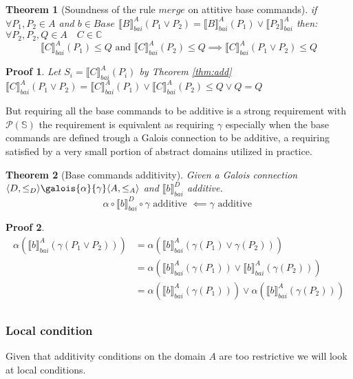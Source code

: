 \documentclass{article}
\newtheorem{theorem}{Theorem}
\newtheorem{proofs}{Proof}
\newcommand*{\sem}[1]{
    \llbracket #1 \rrbracket
}
\newcommand{\bca}[2]{
    #2_{bai}^{#1}
}
\newcommand{\bsem}[2][A]{
    \bca{#1}{\sem{#2}}
}
\def\lang{\mathbb{C}}
\def\state{\mathbb{S}}
\def\pow{\mathcal{P}}
\begin{document}
    \begin{theorem}[Soundness of the rule $merge$ on attitive base commands]
        if $\forall P_1, P_2 \in A$ and $b \in Base$ $\bsem{B}(P_1 \lor P_2)
        = \bsem{B}(P_1) \lor \bsem{P_2}$ then:
        $\forall P_2, P_2, Q \in A \quad C \in \lang$
        $$\bsem{C}(P_1) \leq Q \text{ and } \bsem{C}(P_2) \leq Q \implies
        \bsem{C}(P_1 \lor P_2) \leq Q$$
    \end{theorem}
    \begin{proofs}
        Let $S_i = \bsem{C}(P_i)$ by Theorem \ref{thm:add} 
        $\bsem{C}(P_1 \lor P_2) = \bsem{C}(P_1) \vee \bsem{C}(P_2) \leq Q \lor Q
        = Q$
    \end{proofs}

    But requiring all the base commands to be additive is a strong requirement
    with $\pow(\state)$ the requirement is equivalent as requiring $\gamma$ 
    especially when the base commands are defined trough a Galois connection
    to be additive, a requiring satisfied by a very small portion of abstract
    domains utilized in practice.

    \begin{theorem}[Base commands additivity]
        Given a Galois connection $\langle D, \leq_D \rangle 
        \galois{\alpha}{\gamma} \langle A, \leq_A \rangle$ and
        $\bsem[D]{b}$ additive.
        $$\alpha \circ \bsem[D]{b} \circ \gamma \text{ additive }
        \impliedby \gamma \text{ additive }$$
    \end{theorem}
    \begin{proofs}
        \begin{align*}
            \alpha(\bsem{b}(\gamma(P_1 \lor P_2)))
                &= \alpha(\bsem{b}(\gamma(P_1) \lor \gamma(P_2))) \\
                &= \alpha(\bsem{b}(\gamma(P_1)) \lor \bsem{b}(\gamma(P_2))) \\
                &= \alpha(\bsem{b}(\gamma(P_1))) \lor \alpha(\bsem{b}(\gamma(P_2))) \\
        \end{align*}
    \end{proofs}

\subsubsection{Local condition}
    Given that additivity conditions on the domain $A$ are too restrictive we
    will look at local conditions.
    
\end{document}
